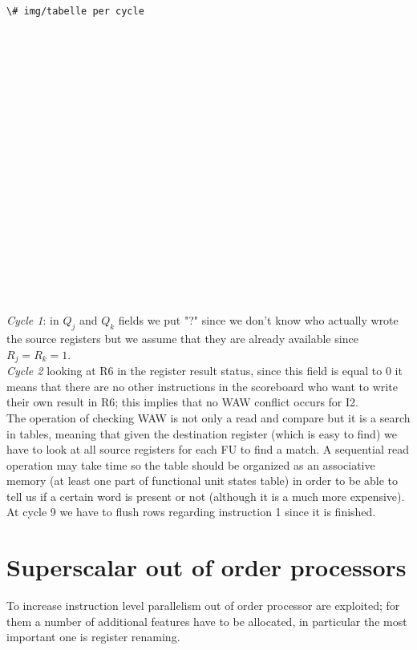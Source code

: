 \begin{verbatim}
\# img/tabelle per cycle



















\end{verbatim}

\textit{Cycle 1}: in $Q_j$ and $Q_k$ fields we put "?" since we don't know who actually wrote the source registers but we assume that they are already available since $R_j=R_k=1$.\\

\textit{Cycle 2} looking at R6 in the register result status, since this field is equal to 0 it means that there are no other instructions in the scoreboard who want to write their own result in R6; this implies that no WAW conflict occurs for I2.\\

The operation of checking WAW is not only a read and compare but it is a search in tables, meaning that given the destination register (which is easy to find) we have to look at all source registers for each FU to find a match. A sequential read operation may take time so the table should be organized as an associative memory (at least one part of functional unit states table) in order to be able to tell us if a certain word is present or not (although it is a much more expensive).\\

At cycle 9 we have to flush rows regarding instruction 1 since it is finished.



\section{Superscalar out of order processors}
To increase instruction level parallelism out of order processor are exploited;
for them a number of additional features have to be allocated, in particular the
most important one is register renaming.


